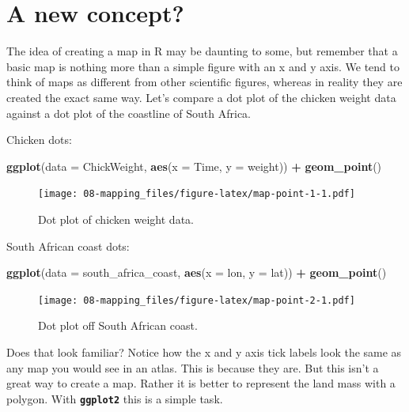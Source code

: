 \documentclass[
]{book}
\newenvironment{Shaded}{\begin{snugshade}}{\end{snugshade}}
\newcommand{\DataTypeTok}[1]{\textcolor[rgb]{0.13,0.29,0.53}{#1}}
\newcommand{\KeywordTok}[1]{\textcolor[rgb]{0.13,0.29,0.53}{\textbf{#1}}}
\newcommand{\NormalTok}[1]{#1}
\newcommand{\OperatorTok}[1]{\textcolor[rgb]{0.81,0.36,0.00}{\textbf{#1}}}
\newcommand{\StringTok}[1]{\textcolor[rgb]{0.31,0.60,0.02}{#1}}
\begin{document}
\hypertarget{a-new-concept}{%
\section{A new concept?}\label{a-new-concept}}

The idea of creating a map in R may be daunting to some, but remember that a basic map is nothing more than a simple figure with an x and y axis. We tend to think of maps as different from other scientific figures, whereas in reality they are created the exact same way. Let's compare a dot plot of the chicken weight data against a dot plot of the coastline of South Africa.

Chicken dots:

\begin{Shaded}
\begin{Highlighting}[]
\KeywordTok{ggplot}\NormalTok{(}\DataTypeTok{data =}\NormalTok{ ChickWeight, }\KeywordTok{aes}\NormalTok{(}\DataTypeTok{x =}\NormalTok{ Time, }\DataTypeTok{y =}\NormalTok{ weight)) }\OperatorTok{+}
\StringTok{  }\KeywordTok{geom\_point}\NormalTok{()}
\end{Highlighting}
\end{Shaded}

\begin{figure}
\centering
\texttt{[image: 08-mapping\_files/figure-latex/map-point-1-1.pdf]}
\caption{\label{fig:map-point-1}Dot plot of chicken weight data.}
\end{figure}

South African coast dots:

\begin{Shaded}
\begin{Highlighting}[]
\KeywordTok{ggplot}\NormalTok{(}\DataTypeTok{data =}\NormalTok{ south\_africa\_coast, }\KeywordTok{aes}\NormalTok{(}\DataTypeTok{x =}\NormalTok{ lon, }\DataTypeTok{y =}\NormalTok{ lat)) }\OperatorTok{+}
\StringTok{  }\KeywordTok{geom\_point}\NormalTok{()}
\end{Highlighting}
\end{Shaded}

\begin{figure}
\centering
\texttt{[image: 08-mapping\_files/figure-latex/map-point-2-1.pdf]}
\caption{\label{fig:map-point-2}Dot plot off South African coast.}
\end{figure}

Does that look familiar? Notice how the x and y axis tick labels look the same as any map you would see in an atlas. This is because they are. But this isn't a great way to create a map. Rather it is better to represent the land mass with a polygon. With \textbf{\texttt{ggplot2}} this is a simple task.
\end{document}
